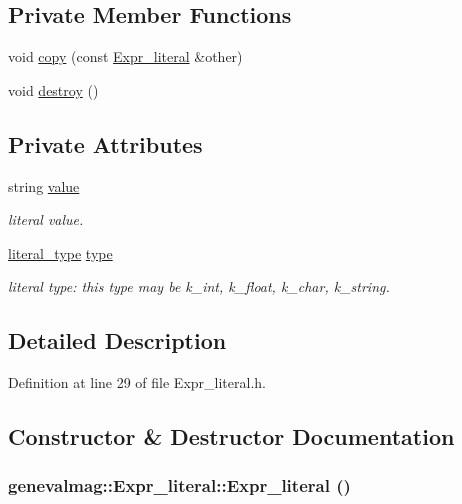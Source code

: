 \subsection*{Private Member Functions}
\begin{CompactItemize}
\item 
void \hyperlink{classgenevalmag_1_1Expr__literal_ab439489dbf96ebac5c518277a681698}{copy} (const \hyperlink{classgenevalmag_1_1Expr__literal}{Expr\_\-literal} \&other)
\item 
void \hyperlink{classgenevalmag_1_1Expr__literal_81c4aedbe32ef9a69e5a63d7387d9dbf}{destroy} ()
\end{CompactItemize}
\subsection*{Private Attributes}
\begin{CompactItemize}
\item 
string \hyperlink{classgenevalmag_1_1Expr__literal_914b947ed414c6aae35eb7abcf8c7128}{value}
\begin{CompactList}\small\item\em literal value. \item\end{CompactList}\item 
\hyperlink{namespacegenevalmag_054e5e9167597919bb2fe12ba999fb31}{literal\_\-type} \hyperlink{classgenevalmag_1_1Expr__literal_9f3d9f0bda8307403f79d3260fa27740}{type}
\begin{CompactList}\small\item\em literal type: this type may be k\_\-int, k\_\-float, k\_\-char, k\_\-string. \item\end{CompactList}\end{CompactItemize}


\subsection{Detailed Description}


Definition at line 29 of file Expr\_\-literal.h.

\subsection{Constructor \& Destructor Documentation}
\hypertarget{classgenevalmag_1_1Expr__literal_ad56a6d5a1929c03b3c19ac10f06bf73}{
\subsubsection[{Expr\_\-literal}]{\setlength{\rightskip}{0pt plus 5cm}genevalmag::Expr\_\-literal::Expr\_\-literal ()}}
\label{classgenevalmag_1_1Expr__literal_ad56a6d5a1929c03b3c19ac10f06bf73}


